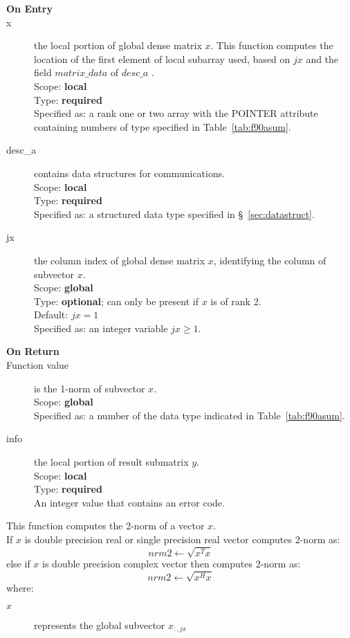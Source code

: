 \begin{description}
\item[\bf On Entry]
\item[x] the local portion of global dense matrix
$x$. This function computes the location of the first element of 
local subarray used, based on $jx$ and the field $matrix\_data$ of $desc\_a$ . \\
Scope: {\bf local} \\
Type: {\bf required} \\
Specified as: a rank one or two array with the POINTER attribute
containing numbers of type specified in
Table~\ref{tab:f90asum}.
\item[desc\_a] contains data structures for communications.\\
Scope: {\bf local} \\
Type: {\bf required}\\
Specified as: a structured data type specified in
\S~\ref{sec:datastruct}.
\item[jx]  the column index of global dense matrix $x$,
identifying the column of subvector $x$.\\
Scope: {\bf global} \\
Type: {\bf optional}; can only be present if $x$ is of rank 2.\\	
Default: $jx = 1$\\	
Specified as: an integer variable $jx\ge 1$. 

\item[\bf On Return] 
\item[Function value] is the 1-norm of subvector $x$.\\
Scope: {\bf global} \\
Specified as: a number of the data type indicated in Table~\ref{tab:f90asum}.
\item[info] the local portion of result submatrix $y$.\\
Scope: {\bf local} \\
Type: {\bf required} \\
An integer value that contains an error code. 
\end{description}


%
%



This function computes the 2-norm of a vector $x$.\\
If $x$ is double precision real or single precision real vector
computes 2-norm as:
\[ nrm2 \leftarrow \sqrt{x^T x}\]
else if $x$ is double precision complex vector then computes 2-norm  as:
\[ nrm2 \leftarrow \sqrt{x^H x}\]
where:
\begin{description}
\item[$x$] represents the global subvector $x_{:,jx}$
\end{description}

